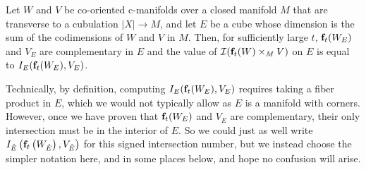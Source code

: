\begin{lemma}\label{L:intersection signs}
	Let $W$ and $V$ be co-oriented c-manifolds over a closed manifold $M$ that are transverse to a cubulation $|X| \to M$, and let $E$ be a cube whose dimension
	is the sum of the codimensions of $W$ and $V$ in $M$.
	Then, for sufficiently large $t$, $\mathbf{f}_t(W_E)$ and $V_E$ are complementary in $E$ and the value of $\mathcal{I}(\mathbf{f}_t(W) \times_M V)$ on $E$
	is equal to $I_E(\mathbf{f}_t(W_E), V_E)$.
\end{lemma}
\begin{remark}
	Technically, by definition, computing $I_E(\mathbf{f}_t(W_E), V_E)$ requires taking a fiber product in $E$, which we would not typically allow as $E$ is a manifold with corners.
	However, once we have proven that $\mathbf{f}_t(W_E)$ and $V_E$ are complementary, their only intersection must be in the interior of $E$.
	So we could just as well write $I_{\mathring{E}}\left(\mathbf{f}_t\left(W_{\mathring{E}}\right), V_{\mathring{E}}\right)$ for this signed intersection number, but we instead choose the simpler notation here, and in some places below, and hope no confusion will arise.
\end{remark}
